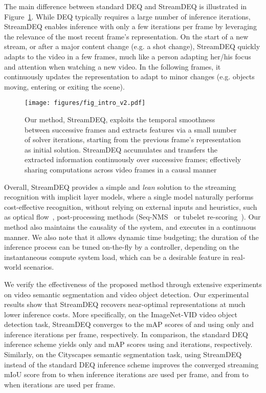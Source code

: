 \documentclass[runningheads]{llncs}
\begin{document}
The main difference between standard DEQ and StreamDEQ is illustrated in Figure~\ref{fig:intro_figure}. While DEQ typically requires a large number of inference iterations, StreamDEQ enables inference with only a few iterations per frame by leveraging the relevance of the most recent frame's representation. On the start of a new stream, or after a major content change (e.g. a shot change), StreamDEQ quickly adapts to the video in a few frames, much like a person adapting her/his focus and attention when watching a new video. In the following frames, it continuously updates the representation to adapt to minor changes (e.g. objects moving, entering or exiting the scene). 


\begin{figure}[t]
\centering
\texttt{[image: figures/fig\_intro\_v2.pdf]}
\caption{Our method, StreamDEQ, exploits the temporal smoothness between successive frames and extracts features via a small number of solver iterations, starting from the previous frame’s representation as initial solution. StreamDEQ accumulates and transfers the extracted information continuously over successive frames; effectively sharing computations across video frames in a causal manner}
\label{fig:intro_figure}
\end{figure}


Overall, StreamDEQ provides a simple and {\em lean} solution to the streaming recognition with implicit layer models, where a single model naturally performs cost-effective recognition, without relying on external inputs and heuristics, such as optical flow~\cite{horn1981determining}, post-processing methods (Seq-NMS~\cite{han2016seq} or tubelet re-scoring~\cite{kang2016object,kang2017tubelets}). Our method also maintains the causality of the system, and executes in a continuous manner. We also note that it allows dynamic time budgeting; the duration of the inference process can be tuned on-the-fly by a controller, depending on the instantaneous compute system load, which can be a desirable feature in real-world scenarios.


We verify the effectiveness of the proposed method through extensive experiments on video semantic segmentation and video object detection. Our experimental results show that StreamDEQ recovers near-optimal representations at much lower inference costs. More specifically, on the ImageNet-VID video object detection task, StreamDEQ converges to the mAP scores of  and  using only  and  inference iterations per frame, respectively. In comparison, the standard DEQ inference scheme yields only  and  mAP scores using  and  iterations, respectively. Similarly, on the Cityscapes semantic segmentation task, using StreamDEQ instead of the standard DEQ inference scheme improves the converged streaming mIoU score from  to  when  inference iterations are used per frame, and from  to  when  iterations are used per frame. 
\end{document}
